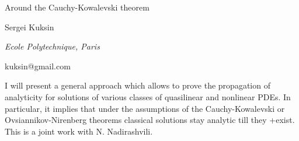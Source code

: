 \documentclass[10pt,a4paper]{article}
\begin{document}
\begin{center}

{\Large Around the Cauchy-Kowalevski theorem}

\bigskip

{\sc Sergei Kuksin}

{\small\it Ecole Polytechnique, Paris}

{\small\rm kuksin@gmail.com}

\end{center}

\bigskip

I will present a general approach which allows to prove the propagation of
analyticity for solutions of various classes of quasilinear and nonlinear PDEs.
In particular, it implies that under  the assumptions of the Cauchy-Kowalevski
or Ovsiannikov-Nirenberg theorems classical solutions stay analytic till they
+exist. This is a joint work with N. Nadirashvili.
\end{document}
